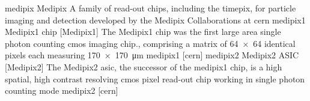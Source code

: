 \newglsXterm%
{medipix}%
{Medipix}%
{A family of read-out chips, including the \gls{timepix}, for particle imaging and detection developed by the Medipix Collaborations at \gls{cern} \cite{website:MedipixColaboration}}%
\newglsXequipment%
{medipix1}%
{Medipix1 chip}%
[Medipix1]%
{The Medipix1 chip was the first large area single photon counting \gls{cmos} imaging chip., comprising a matrix of \num{64 x 64} identical pixels each measuring \SI{170 x 170}{\micro\meter}}%
{medipix1}%
[cern]%
\newglsXequipment%
{medipix2}%
{Medipix2 ASIC}%
[Medipix2]%
{The Medipix2 \gls{asic}, the successor of the \gls{medipix1} chip, is a high spatial, high contrast resolving \gls{cmos} pixel read-out chip working in single photon counting mode}%
{medipix2}%
[cern]%